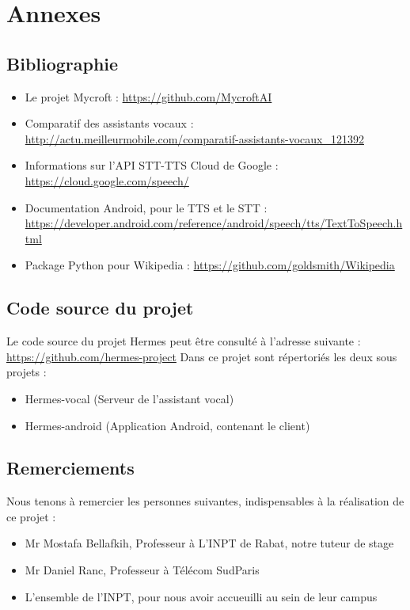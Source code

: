 \documentclass[a4paper,10pt]{report}
\begin{document}
  \chapter{Annexes}
    \section{Bibliographie}
    \begin{itemize}
      \item Le projet Mycroft : \url{https://github.com/MycroftAI}
      \item Comparatif des assistants vocaux : \url{http://actu.meilleurmobile.com/comparatif-assistants-vocaux_121392}
      \item Informations sur l'API STT-TTS Cloud de Google : \url{https://cloud.google.com/speech/}
      \item Documentation Android, pour le TTS et le STT : \url{https://developer.android.com/reference/android/speech/tts/TextToSpeech.html}
      \item Package Python pour Wikipedia : \url{https://github.com/goldsmith/Wikipedia}

    \end{itemize}
    \section{Code source du projet}
    {Le code source du projet Hermes peut être consulté à l'adresse suivante :
    \url{https://github.com/hermes-project}\newline}
    {Dans ce projet sont répertoriés les deux sous projets :}
    \begin{itemize}
      \item Hermes-vocal (Serveur de l'assistant vocal)
      \item Hermes-android (Application Android, contenant le client)
    \end{itemize}

    \section{Remerciements}
    {Nous tenons à remercier les personnes suivantes, indispensables à la réalisation de ce projet :}
    \begin{itemize}
      \item Mr Mostafa Bellafkih, Professeur à L'INPT de Rabat, notre tuteur de stage
      \item Mr Daniel Ranc, Professeur à Télécom SudParis
      \item L'ensemble de l'INPT, pour nous avoir accueuilli au sein de leur campus
    \end{itemize}
\end{document}
